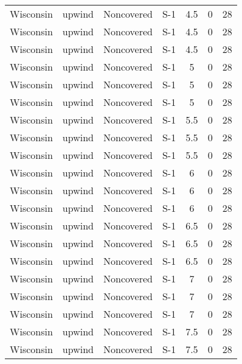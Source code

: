 \documentclass{article}
\begin{document}
\begin{longtable}[c]{ccccccc}
Wisconsin & upwind    & Noncovered & S-1             & 4.5          & 0           & 28  \\
Wisconsin & upwind    & Noncovered & S-1             & 4.5          & 0           & 28  \\
Wisconsin & upwind    & Noncovered & S-1             & 4.5          & 0           & 28  \\
Wisconsin & upwind    & Noncovered & S-1             & 5            & 0           & 28  \\
Wisconsin & upwind    & Noncovered & S-1             & 5            & 0           & 28  \\
Wisconsin & upwind    & Noncovered & S-1             & 5            & 0           & 28  \\
Wisconsin & upwind    & Noncovered & S-1             & 5.5          & 0           & 28  \\
Wisconsin & upwind    & Noncovered & S-1             & 5.5          & 0           & 28  \\
Wisconsin & upwind    & Noncovered & S-1             & 5.5          & 0           & 28  \\
Wisconsin & upwind    & Noncovered & S-1             & 6            & 0           & 28  \\
Wisconsin & upwind    & Noncovered & S-1             & 6            & 0           & 28  \\
Wisconsin & upwind    & Noncovered & S-1             & 6            & 0           & 28  \\
Wisconsin & upwind    & Noncovered & S-1             & 6.5          & 0           & 28  \\
Wisconsin & upwind    & Noncovered & S-1             & 6.5          & 0           & 28  \\
Wisconsin & upwind    & Noncovered & S-1             & 6.5          & 0           & 28  \\
Wisconsin & upwind    & Noncovered & S-1             & 7            & 0           & 28  \\
Wisconsin & upwind    & Noncovered & S-1             & 7            & 0           & 28  \\
Wisconsin & upwind    & Noncovered & S-1             & 7            & 0           & 28  \\
Wisconsin & upwind    & Noncovered & S-1             & 7.5          & 0           & 28  \\
Wisconsin & upwind    & Noncovered & S-1             & 7.5          & 0           & 28  \\

\end{longtable}
\end{document}
